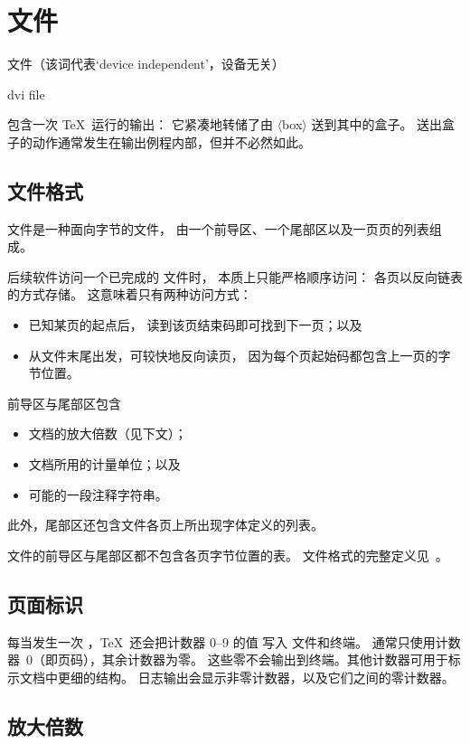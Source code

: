 \documentclass[a4paper]{rapport3}
\def\gr#1{$\langle$#1$\rangle$}\def\key#1{{\tt#1}}
\def\term#1\par{\index{#1}}
\begin{document}
\section{ 文件}

 文件（该词代表`device independent'，设备无关）
\term \n{dvi} file\par
包含一次 \TeX\ 运行的输出：
它紧凑地转储了由 \gr{box} 送到其中的盒子。
送出盒子的动作通常发生在输出例程内部，但并不必然如此。

\subsection{ 文件格式}

 文件是一种面向字节的文件，
由一个前导区、一个尾部区以及一页页的列表组成。

后续软件访问一个已完成的  文件时，
本质上只能严格顺序访问：
各页以反向链表的方式存储。
这意味着只有两种访问方式：
\begin{itemize} \item 已知某页的起点后，
      读到该页结束码即可找到下一页；以及
\item 从文件末尾出发，可较快地反向读页，
      因为每个页起始码都包含上一页的字节位置。\end{itemize}

前导区与尾部区包含
\begin{itemize}\item 文档的放大倍数（见下文）；
\item 文档所用的计量单位；以及
\item 可能的一段注释字符串。\end{itemize}
此外，尾部区还包含文件各页上所出现字体定义的列表。

文件的前导区与尾部区都不包含各页字节位置的表。
 文件格式的完整定义见~\cite{Knuth:TeXprogram}。

\subsection{页面标识}

每当发生一次 ，\TeX\ 还会把计数器 0--9 的值
写入  文件和终端。
通常只使用计数器~0（即页码），其余计数器为零。
这些零不会输出到终端。其他计数器可用于标示文档中更细的结构。
日志输出会显示非零计数器，以及它们之间的零计数器。


\subsection{放大倍数}
\end{document}
